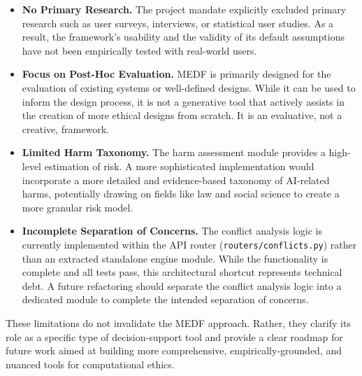 \begin{itemize}[leftmargin=2em]
  \item \textbf{No Primary Research.} The project mandate explicitly excluded primary research such as user surveys, interviews, or statistical user studies. As a result, the framework's usability and the validity of its default assumptions have not been empirically tested with real-world users.

  \item \textbf{Focus on Post-Hoc Evaluation.} MEDF is primarily designed for the evaluation of existing systems or well-defined designs. While it can be used to inform the design process, it is not a generative tool that actively assists in the creation of more ethical designs from scratch. It is an evaluative, not a creative, framework.

  \item \textbf{Limited Harm Taxonomy.} The harm assessment module provides a high-level estimation of risk. A more sophisticated implementation would incorporate a more detailed and evidence-based taxonomy of AI-related harms, potentially drawing on fields like law and social science to create a more granular risk model.

  \item \textbf{Incomplete Separation of Concerns.} The conflict analysis logic is currently implemented within the API router (\texttt{routers/conflicts.py}) rather than an extracted standalone engine module. While the functionality is complete and all tests pass, this architectural shortcut represents technical debt. A future refactoring should separate the conflict analysis logic into a dedicated module to complete the intended separation of concerns.
\end{itemize}

These limitations do not invalidate the MEDF approach. Rather, they clarify its role as a specific type of decision-support tool and provide a clear roadmap for future work aimed at building more comprehensive, empirically-grounded, and nuanced tools for computational ethics.

